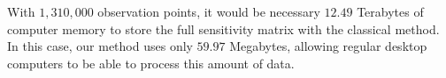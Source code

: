 \documentclass[manuscript,noblind]{geophysics}
\begin{document}
With $1,310,000$ observation points, it would be necessary $12.49$ Terabytes of computer memory to store the full
sensitivity matrix with the classical method. 
In this case, our method uses only $59.97$ Megabytes, allowing regular desktop computers to be able 
to process this amount of data.


%
%
%
%

%
%



\end{document}
